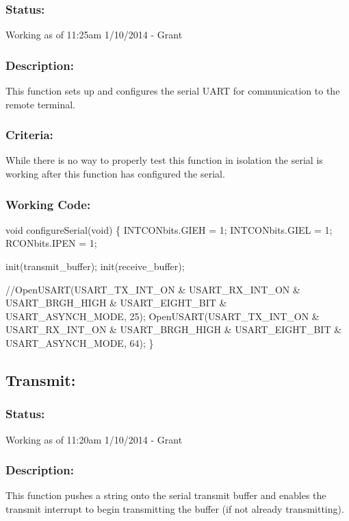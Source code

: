 \documentclass[]{article}
\begin{document}
\subsubsection{Status:}
Working as of 11:25am 1/10/2014 - Grant

\subsubsection{Description:}
This function sets up and configures the serial UART for communication to the remote terminal.

\subsubsection{Criteria:}
While there is no way to properly test this function in isolation the serial is working after this function has configured the serial.

\subsubsection{Working Code:}
void configureSerial(void) \newline
\{ \newline
	INTCONbits.GIEH = 1; \newline
	INTCONbits.GIEL = 1; \newline
	RCONbits.IPEN = 1; \newline
	
	init(transmit\_buffer); \newline
	init(receive\_buffer); \newline
	
	//OpenUSART(USART\_TX\_INT\_ON \& USART\_RX\_INT\_ON \& USART\_BRGH\_HIGH \& USART\_EIGHT\_BIT \& USART\_ASYNCH\_MODE, 25);
	OpenUSART(USART\_TX\_INT\_ON \& USART\_RX\_INT\_ON \& USART\_BRGH\_HIGH \& USART\_EIGHT\_BIT \& USART\_ASYNCH\_MODE, 64);
\}

\subsection{Transmit:}
\subsubsection{Status:}
Working as of 11:20am 1/10/2014 - Grant

\subsubsection{Description:}
This function pushes a string onto the serial transmit buffer and enables the transmit interrupt to begin transmitting the buffer (if not already transmitting).
\end{document}

